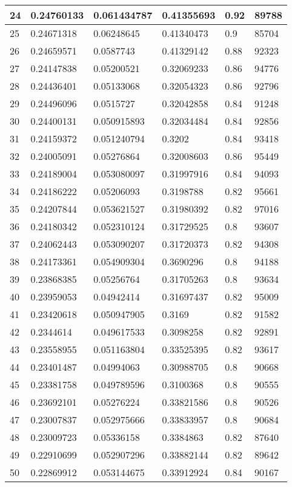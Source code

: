 \begin{longtable}{|l|l|l|l|l|l|}
24 & 0.24760133 & 0.061434787 & 0.41355693 & 0.92 & 89788 \\ \hline 
25 & 0.24671318 & 0.06248645 & 0.41340473 & 0.9 & 85704 \\ \hline 
26 & 0.24659571 & 0.0587743 & 0.41329142 & 0.88 & 92323 \\ \hline 
27 & 0.24147838 & 0.05200521 & 0.32069233 & 0.86 & 94776 \\ \hline 
28 & 0.24436401 & 0.05133068 & 0.32054323 & 0.86 & 92796 \\ \hline 
29 & 0.24496096 & 0.0515727 & 0.32042858 & 0.84 & 91248 \\ \hline 
30 & 0.24400131 & 0.050915893 & 0.32034484 & 0.84 & 92856 \\ \hline 
31 & 0.24159372 & 0.051240794 & 0.3202 & 0.84 & 93418 \\ \hline 
32 & 0.24005091 & 0.05276864 & 0.32008603 & 0.86 & 95449 \\ \hline 
33 & 0.24189004 & 0.053080097 & 0.31997916 & 0.84 & 94093 \\ \hline 
34 & 0.24186222 & 0.05206093 & 0.3198788 & 0.82 & 95661 \\ \hline 
35 & 0.24207844 & 0.053621527 & 0.31980392 & 0.82 & 97016 \\ \hline 
36 & 0.24180342 & 0.052310124 & 0.31729525 & 0.8 & 93607 \\ \hline 
37 & 0.24062443 & 0.053090207 & 0.31720373 & 0.82 & 94308 \\ \hline 
38 & 0.24173361 & 0.054909304 & 0.3690296 & 0.8 & 94188 \\ \hline 
39 & 0.23868385 & 0.05256764 & 0.31705263 & 0.8 & 93634 \\ \hline 
40 & 0.23959053 & 0.04942414 & 0.31697437 & 0.82 & 95009 \\ \hline 
41 & 0.23420618 & 0.050947905 & 0.3169 & 0.82 & 91582 \\ \hline 
42 & 0.2344614 & 0.049617533 & 0.3098258 & 0.82 & 92891 \\ \hline 
43 & 0.23558955 & 0.051163804 & 0.33525395 & 0.82 & 93617 \\ \hline 
44 & 0.23401487 & 0.04994063 & 0.30988705 & 0.8 & 90668 \\ \hline 
45 & 0.23381758 & 0.049789596 & 0.3100368 & 0.8 & 90555 \\ \hline 
46 & 0.23692101 & 0.05276224 & 0.33821586 & 0.8 & 90526 \\ \hline 
47 & 0.23007837 & 0.052975666 & 0.33833957 & 0.8 & 90684 \\ \hline 
48 & 0.23009723 & 0.05336158 & 0.3384863 & 0.82 & 87640 \\ \hline 
49 & 0.22910699 & 0.052907296 & 0.33882144 & 0.82 & 89642 \\ \hline 
50 & 0.22869912 & 0.053144675 & 0.33912924 & 0.84 & 90167 \\ \hline 
\end{longtable}